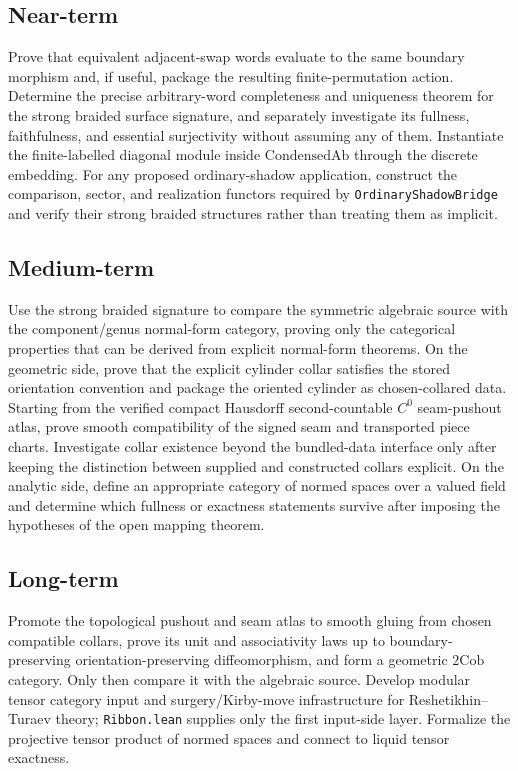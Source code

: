 \documentclass[11pt]{amsart}
\theoremstyle{plain}
\theoremstyle{definition}
\newcommand{\CondAb}{\mathrm{CondensedAb}}
\begin{document}
\subsection{Near-term}
Prove that equivalent adjacent-swap words evaluate to the same boundary morphism and, if useful, package the resulting finite-permutation action. Determine the precise arbitrary-word completeness and uniqueness theorem for the strong braided surface signature, and separately investigate its fullness, faithfulness, and essential surjectivity without assuming any of them. Instantiate the finite-labelled diagonal module inside $\CondAb$ through the discrete embedding. For any proposed ordinary-shadow application, construct the comparison, sector, and realization functors required by \texttt{OrdinaryShadowBridge} and verify their strong braided structures rather than treating them as implicit.

\subsection{Medium-term}
Use the strong braided signature to compare the symmetric algebraic source with the component/genus normal-form category, proving only the categorical properties that can be derived from explicit normal-form theorems. On the geometric side, prove that the explicit cylinder collar satisfies the stored orientation convention and package the oriented cylinder as chosen-collared data. Starting from the verified compact Hausdorff second-countable $C^0$ seam-pushout atlas, prove smooth compatibility of the signed seam and transported piece charts. Investigate collar existence beyond the bundled-data interface only after keeping the distinction between supplied and constructed collars explicit. On the analytic side, define an appropriate category of normed spaces over a valued field and determine which fullness or exactness statements survive after imposing the hypotheses of the open mapping theorem.

\subsection{Long-term}
Promote the topological pushout and seam atlas to smooth gluing from chosen compatible collars, prove its unit and associativity laws up to boundary-preserving orientation-preserving diffeomorphism, and form a geometric $2\mathrm{Cob}$ category. Only then compare it with the algebraic source. Develop modular tensor category input and surgery/Kirby-move infrastructure for Reshetikhin--Turaev theory; \texttt{Ribbon.lean} supplies only the first input-side layer. Formalize the projective tensor product of normed spaces and connect to liquid tensor exactness.
\end{document}
